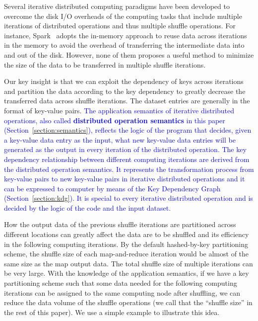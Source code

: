\documentclass[10pt,journal,compsoc]{IEEEtran}
\newcommand{\blue}[1]{\textcolor{blue}{#1}}
\begin{document}
Several iterative distributed computing paradigms \cite{bu2010haloop,
zaharia2012resilient} have been developed to overcome the disk I/O
overheads of the computing tasks that include multiple iterations of
distributed operations and thus multiple shuffle operations.
For instance, Spark~\cite{zaharia2012resilient} adopts the in-memory approach 
to reuse data across iterations in the memory to avoid the overhead of transferring the intermediate data into and out of the disk. 
However, none of them proposes a useful method to minimize the size of
the data to be transferred in multiple shuffle iterations.

Our key insight is that we can exploit the dependency of keys across iterations
and partition the data according to the key dependency to greatly decrease 
the transferred data across shuffle iterations.
The dataset entries are generally in the format of key-value pairs. 
\blue{The application semantics of iterative distributed operations, 
also called \textbf{distributed operation semantics} in this paper (Section~\ref{section:semantics}), 
reflects the logic of the program that decides, given a key-value data entry as the input, 
what new key-value data entries will be generated as the output in every iteration
of the distributed operation. 
The key dependency relationship between different computing iterations 
are derived from the distributed operation semantics.
It represents the transformation process from key-value pairs to new key-value pairs in iterative distributed operations
and it can be expressed to computer by means of the Key Dependency Graph (Section~\ref{section:kdg}).
It is special to every iterative distributed operation
and is decided by the logic of the code and the input dataset. 
}

How the output data of the
previous shuffle iterations are partitioned across different locations
can greatly affect the data are to be
shuffled and its efficiency in the following computing iterations.
By the default hashed-by-key partitioning scheme, the shuffle size of
each map-and-reduce iteration would be almost of the same size as the
map output data. The total shuffle size of multiple iterations
can be very large.
With the knowledge of the application semantics,
if we have a key partitioning scheme such that some data needed for the
following computing iterations can be assigned to the same computing
node after shuffling, we can reduce
the data volume of the shuffle operations (we call that the
``shuffle size'' in the rest of this paper). We use a simple example to
illustrate this idea.
\end{document}
